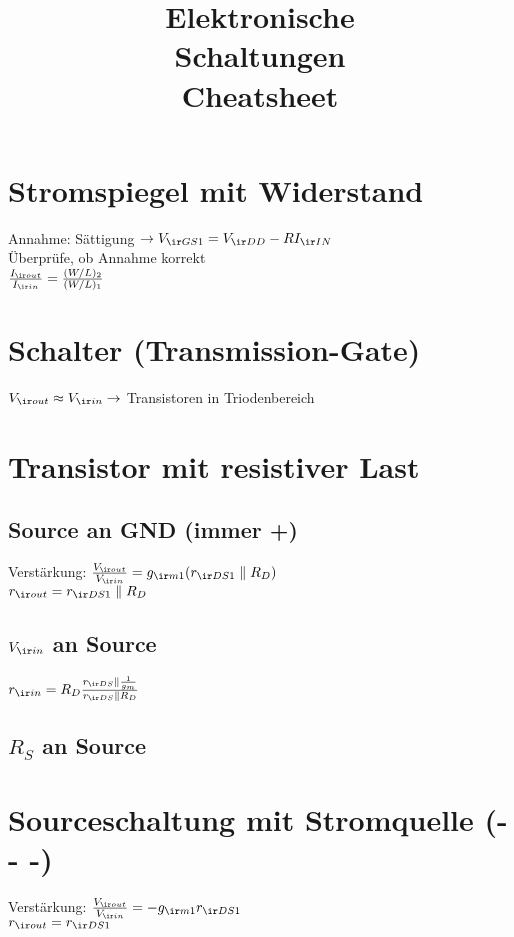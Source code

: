 \documentclass[european]{latex4ei_sheet}
\title{Elektronische \\ Schaltungen \\ Cheatsheet}
\begin{document}
\ifdefined\GitRevision{}\fi

\maketitle

\section{Stromspiegel mit Widerstand}
Annahme: Sättigung $\rightarrow V_{\ir GS1} = V_{\ir DD}-RI_{\ir IN}$\\
Überprüfe, ob Annahme korrekt\\
$\frac{I_{\ir out}}{I_{\ir in}} = \frac{(W/L)_2}{(W/L)_1}$
\section{Schalter (Transmission-Gate)}
$V_{\ir out} \approx V_{\ir in} \rightarrow$ Transistoren in Triodenbereich\\
\section{Transistor mit resistiver Last}
	\subsection{Source an GND (immer +)}
	Verstärkung: $\frac{V_{\ir out}}{V_{\ir in}} = g_{\ir m1}(r_{\ir DS1}\parallel R_D)$\\
	$r_{\ir out} = r_{\ir DS1}\parallel R_D$\\
	\subsection{$V_{\ir in}$ an Source}
	$r_{\ir in} = R_D \frac{r_{\ir DS}\parallel \frac{1}{g_m}}{r_{\ir DS}\parallel R_D}$
	
	\subsection{$R_S$ an Source}
	
	
\section{Sourceschaltung mit Stromquelle (- - -)}
Verstärkung: $\frac{V_{\ir out}}{V_{\ir in}} = -g_{\ir m1}r_{\ir DS1}$\\
$r_{\ir out} = r_{\ir DS1}$
\end{document}
